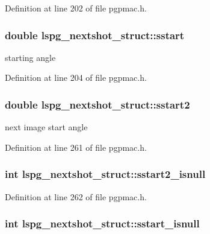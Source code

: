 Definition at line 202 of file pgpmac.\-h.

\hypertarget{structlspg__nextshot__struct_a8dc11eaa094d59f61642c4abc226918f}{
\subsubsection[{sstart}]{\setlength{\rightskip}{0pt plus 5cm}double lspg\-\_\-nextshot\-\_\-struct\-::sstart}}\label{structlspg__nextshot__struct_a8dc11eaa094d59f61642c4abc226918f}


starting angle 



Definition at line 204 of file pgpmac.\-h.

\hypertarget{structlspg__nextshot__struct_a8445cbd2206dc6d62b6bd433f5218c98}{
\subsubsection[{sstart2}]{\setlength{\rightskip}{0pt plus 5cm}double lspg\-\_\-nextshot\-\_\-struct\-::sstart2}}\label{structlspg__nextshot__struct_a8445cbd2206dc6d62b6bd433f5218c98}


next image start angle 



Definition at line 261 of file pgpmac.\-h.

\hypertarget{structlspg__nextshot__struct_a240c8532d5ce48dbc872d5123a4e721c}{
\subsubsection[{sstart2\-\_\-isnull}]{\setlength{\rightskip}{0pt plus 5cm}int lspg\-\_\-nextshot\-\_\-struct\-::sstart2\-\_\-isnull}}\label{structlspg__nextshot__struct_a240c8532d5ce48dbc872d5123a4e721c}


Definition at line 262 of file pgpmac.\-h.

\hypertarget{structlspg__nextshot__struct_aa53094de91e2f69d7174ab119df1cdac}{
\subsubsection[{sstart\-\_\-isnull}]{\setlength{\rightskip}{0pt plus 5cm}int lspg\-\_\-nextshot\-\_\-struct\-::sstart\-\_\-isnull}}\label{structlspg__nextshot__struct_aa53094de91e2f69d7174ab119df1cdac}


